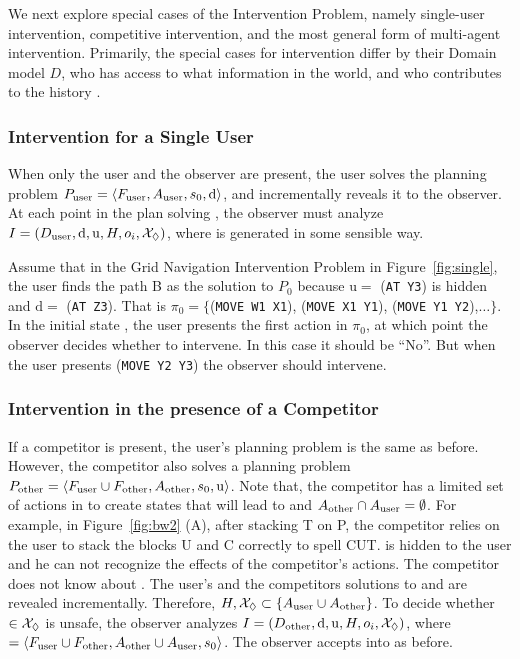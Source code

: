 We next explore special cases of the Intervention Problem, namely single-user intervention, competitive intervention, and the most general form of multi-agent intervention.
Primarily, the special cases for intervention differ by their Domain model $D$, who has access to what information in the world, and who contributes to the history \historyDef.


\subsubsection{Intervention for a Single User}

When only the user and the observer are present, the user solves the planning problem $P_{\textnormal{user}}=\langle F_{\textnormal{user}}, A_{\textnormal{user}}, s_0, \mathrm{d}\rangle$, and incrementally reveals it to the observer. 
At each point in the plan solving \problemUser, the observer must analyze $I = (D_{\textnormal{user}}, \mathrm{d}, \mathrm{u}, H, o_i, \mathcal{X}_\Diamond)$, where \Suffixes is generated in some sensible way.

Assume that in the Grid Navigation Intervention Problem in Figure~\ref{fig:single}, the user finds the path B as the solution to $P_0$ because $\mathrm{u}= $ (\texttt{AT Y3}) is hidden and $\mathrm{d}= $ (\texttt{\textsc{AT Z3}}).
That is $\pi_0=\lbrace$(\texttt{\textsc{MOVE W1 X1}}), (\texttt{\textsc{MOVE X1 Y1}}), (\texttt{\textsc{MOVE Y1 Y2}}),$\ldots\rbrace$.
In the initial state \initialState, the user presents the first action in $\pi_0$, at which point the observer decides whether to intervene.
In this case it should be ``No''.
But when the user presents (\texttt{\textsc{MOVE Y2 Y3}}) the observer should intervene.


\subsubsection{Intervention in the presence of a Competitor}
If a competitor is present, the user's planning problem \problemUser  is the same as before. 
However, the competitor also solves a planning problem $P_{\textnormal{other}}=\langle F_{\textnormal{user}} \cup F_{\textnormal{other}}, A_{\textnormal{other}}, s_0, \mathrm{u}\rangle$.
Note that, the competitor has a limited set of actions in \actionsOther to create states that will lead to \undesired and $A_{\textnormal{other}}\cap A_{\textnormal{user}}=\emptyset$.
For example, in Figure~\ref{fig:bw2} (A), after stacking T on P, the competitor relies on the user to stack the blocks U and C correctly to spell CUT.
\undesired is hidden to the user and he can not recognize the effects of the competitor's actions. The competitor does not know about \desired.
The user's and the competitors solutions to \problemUser and \problemOther are revealed incrementally.
Therefore, $H,\mathcal{X}_\Diamond \subset \lbrace A_{\textnormal{user}}\cup A_{\textnormal{other}}\rbrace$. 
To decide whether \Suffix $\in\mathcal{X}_\Diamond$ is unsafe, the observer analyzes $I = (D_{\textnormal{other}}, \mathrm{d}, \mathrm{u}, H, o_i, \mathcal{X}_\Diamond)$, where \domainOther$=\langle F_{\textnormal{user}} \cup F_{\textnormal{other}},A_{\textnormal{other}}\cup A_{\textnormal{user}},s_0\rangle$.
The observer accepts \presentedAction into \historyDef as before.


